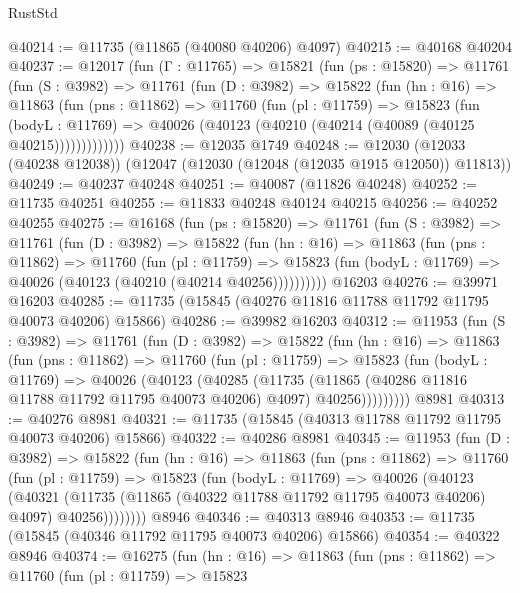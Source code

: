 \begin{lexlean}{RustStd}
\begin{coremodule}
@40214 := @11735 (@11865 (@40080 @40206) @4097)
@40215 := @40168 @40204
@40237 := @12017
    (fun (Γ : @11765) =>
    @15821
      (fun (ps : @15820) =>
      @11761
        (fun (S : @3982) =>
        @11761
          (fun (D : @3982) =>
          @15822
            (fun (hn : @16) =>
            @11863
              (fun (pns : @11862) =>
              @11760
                (fun (pl : @11759) =>
                @15823
                  (fun (bodyL : @11769) =>
                  @40026 (@40123 (@40210 (@40214 (@40089 (@40125 @40215)))))))))))))
@40238 := @12035 @1749
@40248 := @12030 (@12033 (@40238 @12038)) (@12047 (@12030 (@12048 (@12035 @1915 @12050)) @11813))
@40249 := @40237 @40248
@40251 := @40087 (@11826 @40248)
@40252 := @11735 @40251
@40255 := @11833 @40248 @40124 @40215
@40256 := @40252 @40255
@40275 := @16168
    (fun (ps : @15820) =>
    @11761
      (fun (S : @3982) =>
      @11761
        (fun (D : @3982) =>
        @15822
          (fun (hn : @16) =>
          @11863
            (fun (pns : @11862) =>
            @11760
              (fun (pl : @11759) =>
              @15823 (fun (bodyL : @11769) => @40026 (@40123 (@40210 (@40214 @40256))))))))))
    @16203
@40276 := @39971 @16203
@40285 := @11735 (@15845 (@40276 @11816 @11788 @11792 @11795 @40073 @40206) @15866)
@40286 := @39982 @16203
@40312 := @11953
    (fun (S : @3982) =>
    @11761
      (fun (D : @3982) =>
      @15822
        (fun (hn : @16) =>
        @11863
          (fun (pns : @11862) =>
          @11760
            (fun (pl : @11759) =>
            @15823
              (fun (bodyL : @11769) =>
              @40026
                (@40123
                  (@40285
                    (@11735
                      (@11865 (@40286 @11816 @11788 @11792 @11795 @40073 @40206) @4097)
                      @40256)))))))))
    @8981
@40313 := @40276 @8981
@40321 := @11735 (@15845 (@40313 @11788 @11792 @11795 @40073 @40206) @15866)
@40322 := @40286 @8981
@40345 := @11953
    (fun (D : @3982) =>
    @15822
      (fun (hn : @16) =>
      @11863
        (fun (pns : @11862) =>
        @11760
          (fun (pl : @11759) =>
          @15823
            (fun (bodyL : @11769) =>
            @40026
              (@40123
                (@40321
                  (@11735 (@11865 (@40322 @11788 @11792 @11795 @40073 @40206) @4097) @40256))))))))
    @8946
@40346 := @40313 @8946
@40353 := @11735 (@15845 (@40346 @11792 @11795 @40073 @40206) @15866)
@40354 := @40322 @8946
@40374 := @16275
    (fun (hn : @16) =>
    @11863
      (fun (pns : @11862) =>
      @11760
        (fun (pl : @11759) =>
        @15823

\end{coremodule}
\end{lexlean}
